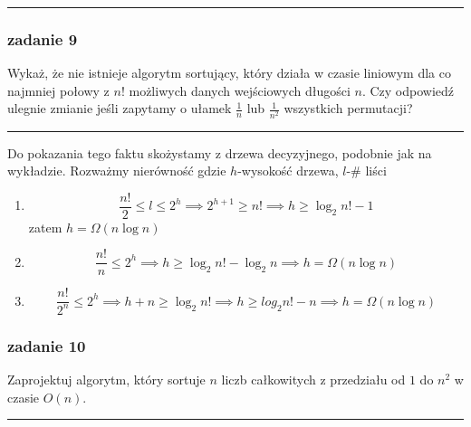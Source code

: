 \documentclass[11pt,a4paper]{article}
\begin{document}
\bigskip
\hrule
\bigskip


\subsubsection{zadanie 9}
Wykaż, że nie istnieje algorytm sortujący, który działa w czasie liniowym dla co najmniej połowy z $n!$ możliwych danych wejściowych długości $n$. Czy odpowiedź ulegnie zmianie jeśli zapytamy o ułamek $\frac{1}{n}$ lub $\frac{1}{n^2}$ wszystkich permutacji?

\bigskip
\hrule
\bigskip

Do pokazania tego faktu skożystamy z drzewa decyzyjnego, podobnie jak na wykładzie. Rozważmy nierówność gdzie $h$-wysokość drzewa, $l$-# liści
\begin{enumerate}
    \item
        \[
            \frac{n!}{2} \leq l \leq 2^h \implies 2^{h+1} \geq n! \implies h \geq \log_2 n! -1
        \]
        zatem $h = \Omega (n \log n)$
    \item
        \[
            \frac{n!}{n} \leq 2^h \implies h \geq \log_2 n! - \log_2 n \implies h = \Omega(n \log n)
        \]
    \item
        \[
            \frac{n!}{2^n} \leq 2^h \implies h+n \geq \log_2 n! \implies h \geq log_2 n! - n \implies h = \Omega(n \log n)
        \]
\end{enumerate}

\subsubsection{zadanie 10}
Zaprojektuj algorytm, który sortuje $n$ liczb całkowitych z przedziału od $1$ do $n^2$ w czasie $O(n)$.

\bigskip
\hrule
\bigskip
\end{document}
